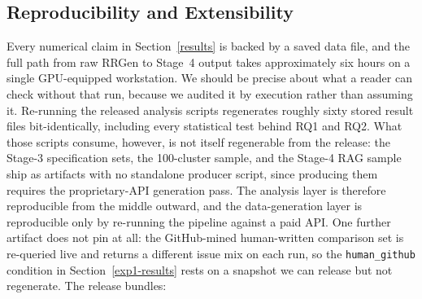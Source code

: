 \documentclass[preprint,12pt]{elsarticle}
\begin{document}
\subsection{Reproducibility and Extensibility}\label{reproducibility}
Every numerical claim in Section~\ref{results} is backed by a saved data file, and the full path from raw RRGen to Stage~4 output takes approximately six hours on a single GPU-equipped workstation. We should be precise about what a reader can check without that run, because we audited it by execution rather than assuming it. Re-running the released analysis scripts regenerates roughly sixty stored result files bit-identically, including every statistical test behind RQ1 and RQ2. What those scripts consume, however, is not itself regenerable from the release: the Stage-3 specification sets, the 100-cluster sample, and the Stage-4 RAG sample ship as artifacts with no standalone producer script, since producing them requires the proprietary-API generation pass. The analysis layer is therefore reproducible from the middle outward, and the data-generation layer is reproducible only by re-running the pipeline against a paid API. One further artifact does not pin at all: the GitHub-mined human-written comparison set is re-queried live and returns a different issue mix on each run, so the \texttt{human\_github} condition in Section~\ref{exp1-results} rests on a snapshot we can release but not regenerate. The release bundles:
\end{document}
